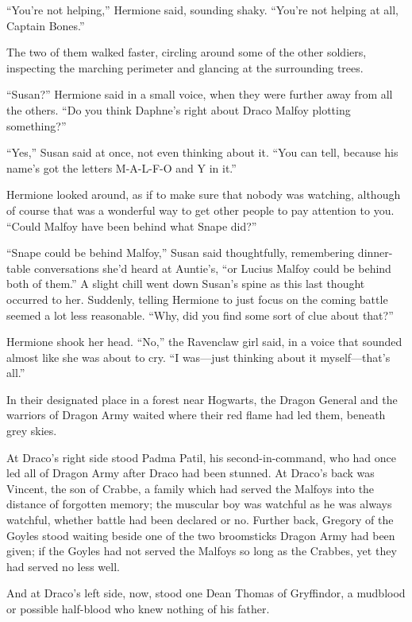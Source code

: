 “You’re not helping,” Hermione said, sounding shaky. “You’re not helping at all, Captain Bones.”

The two of them walked faster, circling around some of the other soldiers, inspecting the marching perimeter and glancing at the surrounding trees.

“Susan?” Hermione said in a small voice, when they were further away from all the others. “Do you think Daphne’s right about Draco Malfoy plotting something?”

“Yes,” Susan said at once, not even thinking about it. “You can tell, because his name’s got the letters M-A-L-F-O and Y in it.”

Hermione looked around, as if to make sure that nobody was watching, although of course that was a wonderful way to get other people to pay attention to you. “Could Malfoy have been behind what Snape did?”

“Snape could be behind Malfoy,” Susan said thoughtfully, remembering dinner-table conversations she’d heard at Auntie’s, “or Lucius Malfoy could be behind both of them.” A slight chill went down Susan’s spine as this last thought occurred to her. Suddenly, telling Hermione to just focus on the coming battle seemed a lot less reasonable. “Why, did you find some sort of clue about that?”

Hermione shook her head. “No,” the Ravenclaw girl said, in a voice that sounded almost like she was about to cry. “I was—just thinking about it myself—that’s all.”

\later

In their designated place in a forest near Hogwarts, the Dragon General and the warriors of Dragon Army waited where their red flame had led them, beneath grey skies.

At Draco’s right side stood Padma Patil, his second-in-command, who had once led all of Dragon Army after Draco had been stunned. At Draco’s back was Vincent, the son of Crabbe, a family which had served the Malfoys into the distance of forgotten memory; the muscular boy was watchful as he was always watchful, whether battle had been declared or no. Further back, Gregory of the Goyles stood waiting beside one of the two broomsticks Dragon Army had been given; if the Goyles had not served the Malfoys so long as the Crabbes, yet they had served no less well.

And at Draco’s left side, now, stood one Dean Thomas of Gryffindor, a mudblood or possible half-blood who knew nothing of his father.

